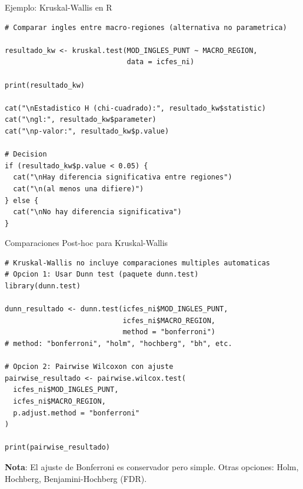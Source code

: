 \documentclass[aspectratio=169, 11pt]{beamer}
\begin{document}
\begin{frame}[fragile]{Ejemplo: Kruskal-Wallis en R}
\begin{lstlisting}
# Comparar ingles entre macro-regiones (alternativa no parametrica)

resultado_kw <- kruskal.test(MOD_INGLES_PUNT ~ MACRO_REGION,
                             data = icfes_ni)

print(resultado_kw)

cat("\nEstadistico H (chi-cuadrado):", resultado_kw$statistic)
cat("\ngl:", resultado_kw$parameter)
cat("\np-valor:", resultado_kw$p.value)

# Decision
if (resultado_kw$p.value < 0.05) {
  cat("\nHay diferencia significativa entre regiones")
  cat("\n(al menos una difiere)")
} else {
  cat("\nNo hay diferencia significativa")
}
\end{lstlisting}
\end{frame}

\begin{frame}[fragile]{Comparaciones Post-hoc para Kruskal-Wallis}
\begin{lstlisting}[basicstyle=\ttfamily\scriptsize]
# Kruskal-Wallis no incluye comparaciones multiples automaticas
# Opcion 1: Usar Dunn test (paquete dunn.test)
library(dunn.test)

dunn_resultado <- dunn.test(icfes_ni$MOD_INGLES_PUNT,
                            icfes_ni$MACRO_REGION,
                            method = "bonferroni")
# method: "bonferroni", "holm", "hochberg", "bh", etc.

# Opcion 2: Pairwise Wilcoxon con ajuste
pairwise_resultado <- pairwise.wilcox.test(
  icfes_ni$MOD_INGLES_PUNT,
  icfes_ni$MACRO_REGION,
  p.adjust.method = "bonferroni"
)

print(pairwise_resultado)
\end{lstlisting}

\vspace{0.1cm}
\small
\textbf{Nota}: El ajuste de Bonferroni es conservador pero simple. Otras opciones: Holm, Hochberg, Benjamini-Hochberg (FDR).
\end{frame}
\end{document}
